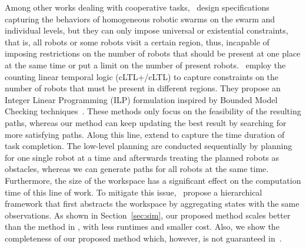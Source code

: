 \documentclass[Afour,sageh,times]{sagej}
\begin{document}
Among other works dealing with cooperative tasks,~\cite{moarref2017decentralized} design specifications capturing the behaviors of homogeneous robotic swarms on the swarm and individual levels, but they can only impose universal or existential constraints, that is, all robots or some robots visit a certain region, thus, incapable of imposing restrictions on the number of robots that should be present at one place at the same time or put a limit on the number of present robots.~\cite{sahin2017provably,sahin2017synchronous,sahin2019multirobot} employ the counting linear temporal logic (cLTL+/cLTL) to capture constraints on the number of robots that must be present in different regions. They propose an Integer Linear Programming (ILP) formulation inspired by Bounded Model Checking techniques~\citep{biere2006linear}. These methods only focus on the feasibility of the resulting paths, whereas our  method can keep updating the best result  by searching for more satisfying paths. %
Along this line, \cite{JoLeVaSaSeTrBe-ISRR-2019} extend to capture the time duration of task completion. The low-level planning are conducted sequentially by planning for one single robot at a time and afterwards treating the planned robots as obstacles, whereas we can generate paths for all robots at the same time. Furthermore, the size of the workspace has a significant effect on the computation time of this line of work. To mitigate this issue,~\cite{sahin2019multi} propose a hierarchical framework that first abstracts the workspace by aggregating states with the same observations. As shown in Section~\ref{sec:sim}, our proposed method  scales better than the method in \cite{sahin2019multi}, with less runtimes and smaller cost. Also, we show the completeness of our proposed method which, however, is not guaranteed in~\cite{sahin2019multi}.

\end{document}
